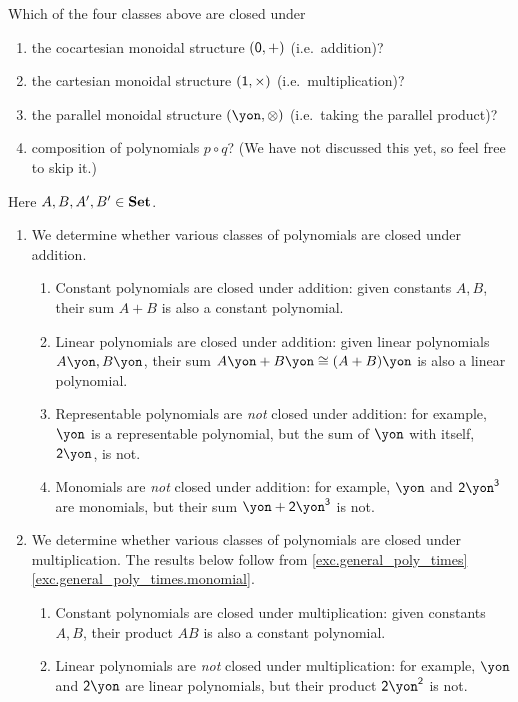 \documentclass[Book-Poly]{subfiles}
\begin{document}
\begin{exercise}
Which of the four classes above are closed under
\begin{enumerate}
	\item the cocartesian monoidal structure $(\textsf{0},+)$ (i.e.\ addition)?
	\item the cartesian monoidal structure $(\textsf{1},\times)$ (i.e.\ multiplication)?
	\item the parallel monoidal structure $(\yon,\otimes)$ (i.e.\ taking the parallel product)?
	\item composition of polynomials $p\circ q$? (We have not discussed this yet, so feel free to skip it.)
\qedhere
\end{enumerate}
\begin{solution}
Here $A, B, A', B' \in \mathbf{Set}$.
\begin{enumerate}
    \item We determine whether various classes of polynomials are closed under addition.
    \begin{enumerate}
        \item Constant polynomials are closed under addition: given constants $A, B$, their sum $A + B$ is also a constant polynomial.
        \item Linear polynomials are closed under addition: given linear polynomials $A\yon, B\yon$, their sum $A\yon + B\yon \iso (A + B)\yon$ is also a linear polynomial.
        \item Representable polynomials are \emph{not} closed under addition: for example, $\yon$ is a representable polynomial, but the sum of $\yon$ with itself, $\2\yon$, is not.
        \item Monomials are \emph{not} closed under addition: for example, $\yon$ and $\2\yon^\3$ are monomials, but their sum $\yon + \2\yon^\3$ is not.
    \end{enumerate}
    \item We determine whether various classes of polynomials are closed under multiplication.
    The results below follow from \cref{exc.general_poly_times} \cref{exc.general_poly_times.monomial}.
    \begin{enumerate}
        \item Constant polynomials are closed under multiplication: given constants $A, B$, their product $AB$ is also a constant polynomial.
        \item Linear polynomials are \emph{not} closed under multiplication: for example, $\yon$ and $\2\yon$ are linear polynomials, but their product $\2\yon^\2$ is not.

\end{enumerate}
\end{enumerate}
\end{solution}
\end{exercise}
\end{document}
